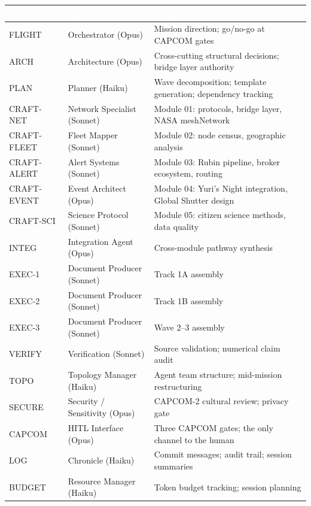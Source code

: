 \documentclass[11pt,letterpaper]{article}
\newcommand{\tableheader}[1]{\textbf{\sffamily\textcolor{white}{#1}}}
\begin{document}
\begin{center}
\begin{tabularx}{\textwidth}{L{2cm}L{3.5cm}X}
\toprule
{}
\tableheader{Role} & \tableheader{Agent} & \tableheader{Responsibility} \\
\midrule
FLIGHT & Orchestrator (Opus) & Mission direction; go/no-go at CAPCOM gates \\
ARCH & Architecture (Opus) & Cross-cutting structural decisions; bridge layer authority \\
PLAN & Planner (Haiku) & Wave decomposition; template generation; dependency tracking \\
CRAFT-NET & Network Specialist (Sonnet) & Module 01: protocols, bridge layer, NASA meshNetwork \\
CRAFT-FLEET & Fleet Mapper (Sonnet) & Module 02: node census, geographic analysis \\
CRAFT-ALERT & Alert Systems (Sonnet) & Module 03: Rubin pipeline, broker ecosystem, routing \\
CRAFT-EVENT & Event Architect (Opus) & Module 04: Yuri's Night integration, Global Shutter design \\
CRAFT-SCI & Science Protocol (Sonnet) & Module 05: citizen science methods, data quality \\
INTEG & Integration Agent (Opus) & Cross-module pathway synthesis \\
EXEC-1 & Document Producer (Sonnet) & Track 1A assembly \\
EXEC-2 & Document Producer (Sonnet) & Track 1B assembly \\
EXEC-3 & Document Producer (Sonnet) & Wave 2--3 assembly \\
VERIFY & Verification (Sonnet) & Source validation; numerical claim audit \\
TOPO & Topology Manager (Haiku) & Agent team structure; mid-mission restructuring \\
SECURE & Security / Sensitivity (Opus) & CAPCOM-2 cultural review; privacy gate \\
CAPCOM & HITL Interface (Opus) & Three CAPCOM gates; the only channel to the human \\
LOG & Chronicle (Haiku) & Commit messages; audit trail; session summaries \\
BUDGET & Resource Manager (Haiku) & Token budget tracking; session planning \\
\bottomrule
\end{tabularx}
\end{center}
\end{document}
